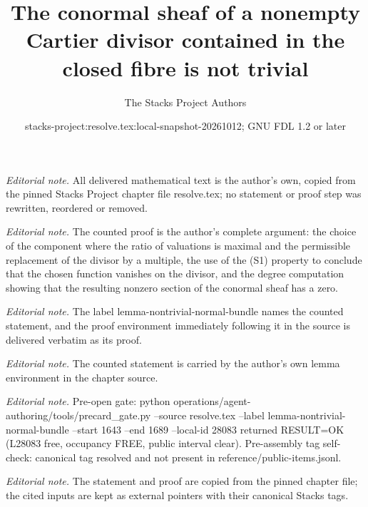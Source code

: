 \documentclass[10pt,a4paper]{amsart}
\title{The conormal sheaf of a nonempty Cartier divisor contained in the closed fibre is not trivial}
\author{The Stacks Project Authors}
\date{stacks-project:resolve.tex:local-snapshot-20261012; GNU FDL 1.2 or later}
\theoremstyle{plain}
\theoremstyle{definition}
\theoremstyle{remark}
\numberwithin{equation}{subsection}
\begin{document}
\maketitle
\noindent\textit{Editorial note.} All delivered mathematical text is the author's own, copied from the pinned Stacks Project chapter file resolve.tex; no statement or proof step was rewritten, reordered or removed.\par\medskip
\noindent\textit{Editorial note.} The counted proof is the author's complete argument: the choice of the component where the ratio of valuations is maximal and the permissible replacement of the divisor by a multiple, the use of the (S1) property to conclude that the chosen function vanishes on the divisor, and the degree computation showing that the resulting nonzero section of the conormal sheaf has a zero.\par\medskip
\noindent\textit{Editorial note.} The label lemma-nontrivial-normal-bundle names the counted statement, and the proof environment immediately following it in the source is delivered verbatim as its proof.\par\medskip
\noindent\textit{Editorial note.} The counted statement is carried by the author's own lemma environment in the chapter source.\par\medskip
\noindent\textit{Editorial note.} Pre-open gate: python operations/agent-authoring/tools/precard\_gate.py --source resolve.tex --label lemma-nontrivial-normal-bundle --start 1643 --end 1689 --local-id 28083 returned RESULT=OK (L28083 free, occupancy FREE, public interval clear). Pre-assembly tag self-check: canonical tag resolved and not present in reference/public-items.jsonl.\par\medskip
\noindent\textit{Editorial note.} The statement and proof are copied from the pinned chapter file; the cited inputs are kept as external pointers with their canonical Stacks tags.\par\medskip
\end{document}
